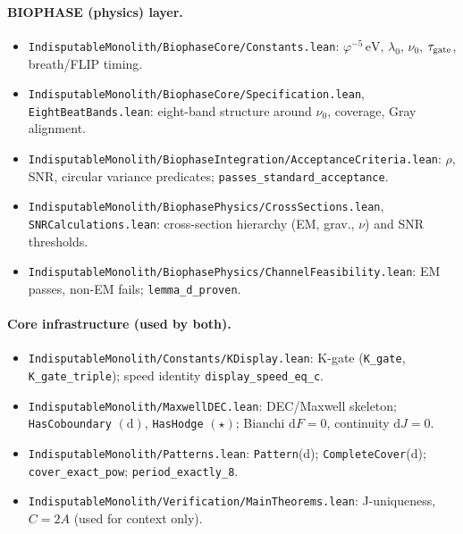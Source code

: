 \documentclass[12pt,a4paper]{article}
\begin{document}
\paragraph{BIOPHASE (physics) layer.}
\begin{itemize}
  \item \texttt{IndisputableMonolith/BiophaseCore/Constants.lean}:
    \(\varphi^{-5}\,\mathrm{eV}\), \(\lambda_0\), \(\nu_0\), \(\tau_{\rm gate}\), breath/FLIP timing.
  \item \texttt{IndisputableMonolith/BiophaseCore/Specification.lean}, \texttt{EightBeatBands.lean}:
    eight-band structure around \(\nu_0\), coverage, Gray alignment.
  \item \texttt{IndisputableMonolith/BiophaseIntegration/AcceptanceCriteria.lean}:
    \(\rho\), SNR, circular variance predicates; \texttt{passes\_standard\_acceptance}.
  \item \texttt{IndisputableMonolith/BiophasePhysics/CrossSections.lean}, \texttt{SNRCalculations.lean}:
    cross-section hierarchy (EM, grav., \(\nu\)) and SNR thresholds.
  \item \texttt{IndisputableMonolith/BiophasePhysics/ChannelFeasibility.lean}:
    EM passes, non-EM fails; \texttt{lemma\_d\_proven}.
\end{itemize}

\paragraph{Core infrastructure (used by both).}
\begin{itemize}
  \item \texttt{IndisputableMonolith/Constants/KDisplay.lean}:
    K-gate (\texttt{K\_gate}, \texttt{K\_gate\_triple}); speed identity \texttt{display\_speed\_eq\_c}.
  \item \texttt{IndisputableMonolith/MaxwellDEC.lean}:
    DEC/Maxwell skeleton; \texttt{HasCoboundary} \((\mathrm{d})\), \texttt{HasHodge} \((\star)\); Bianchi \(\mathrm{d}F=0\), continuity \(\mathrm{d}J=0\).
  \item \texttt{IndisputableMonolith/Patterns.lean}:
    \texttt{Pattern}(d); \texttt{CompleteCover}(d); \texttt{cover\_exact\_pow}; \texttt{period\_exactly\_8}.
  \item \texttt{IndisputableMonolith/Verification/MainTheorems.lean}:
    J-uniqueness, \(C{=}2A\) (used for context only).
\end{itemize}
\end{document}
